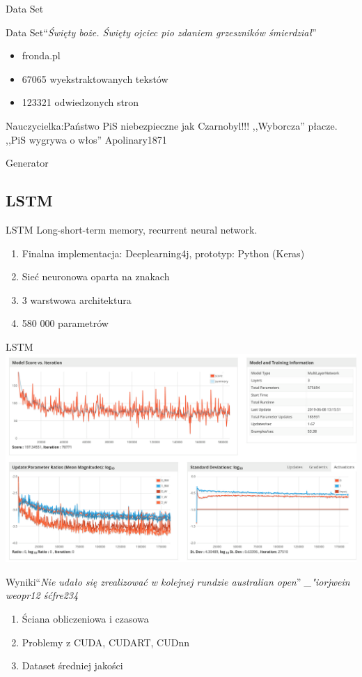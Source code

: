 \documentclass[14pt]{beamer}
\newcommand{\fakehead}[1]{``\textit{#1}''}
\begin{document}
\begin{section}{Data Set}
	\begin{frame}{Data Set}{\fakehead{Święty boże. Święty ojciec pio zdaniem grzeszników śmierdział}}
		\begin{itemize}
			\item fronda.pl
			\item{67065 wyekstraktowanych tekstów}
			\item{123321 odwiedzonych stron}
		\end{itemize}

		Nauczycielka:Państwo PiS niebezpieczne jak Czarnobyl!!!
		,,Wyborcza'' płacze. ,,PiS wygrywa o włos''
		Apolinary1871
	\end{frame}
\end{section}

\begin{section}{Generator}
	\subsection{LSTM}

	\begin{frame}{LSTM}
		Long-short-term memory, recurrent neural network.
		\begin{enumerate}
			\item Finalna implementacja: Deeplearning4j, prototyp: Python (Keras)
			\item Sieć neuronowa oparta na znakach
			\item 3 warstwowa architektura
			\item 580 000 parametrów
		\end{enumerate}
	\end{frame}
	\begin{frame}[fragile]{LSTM}
		\includegraphics[width=\linewidth]{lstm.png}
	\end{frame}
	\begin{frame}{Wyniki}{\fakehead{Nie udało się zrealizować w kolejnej rundzie australian open}}
			{\textit{\_"iorjwein weopr12 śćfre234}}
		\begin{enumerate}
			\item Ściana obliczeniowa i czasowa
			\item Problemy z CUDA, CUDART, CUDnn
			\item Dataset średniej jakości
		\end{enumerate}
	\end{frame}

\end{section}
\end{document}
